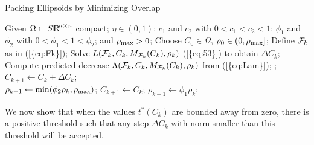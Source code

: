 \documentclass{siamltex}
\begin{document}
\begin{algorithm} \label{alg:xxx}
\caption{Packing Ellipsoids by Minimizing Overlap}
\begin{algorithmic}
  \STATE Given $\Omega \subset S {\makebox{\sf I \hspace{-8.5 pt} R \hspace{-4.0pt}}}^{n \times n}$ compact; $\eta \in
  (0,1)$; $c_1$ and $c_2$ with $0 < c_1 < c_2 < 1$; $\phi_1$ and
  $\phi_2$ with $0 < \phi_1 < 1 < \phi_2$; and
  ${\rho_{\mbox{\rm\scriptsize max}}} >0$;
\STATE Choose $C_0 \in \Omega$, $\rho_0 \in (0,{\rho_{\mbox{\rm\scriptsize max}}}]$;
\STATE Define ${{\cal F}}_k$  as in {(\ref{{eq:Fk}})}; 
\STATE Solve $L({{\cal F}}_k,C_k,M_{{{\cal F}}_k}(C_k),\rho_k)$ {(\ref{{eq:53}})} to obtain ${\Delta C}_k$; 
\STATE Compute predicted decrease  $\Lambda({{\cal F}}_k,C_k,M_{{{\cal F}}_k}(C_k),\rho_k)$ from
{(\ref{{eq:Lam}})};
;
\ENDIF
{}
\STATE $ C_{k+1} \leftarrow C_k + {\Delta C}_k$; \\
\STATE $\rho_{k+1}  \leftarrow \min( \phi_2 \rho_k, {\rho_{\mbox{\rm\scriptsize max}}})$; 
\ENDIF
\ELSE
\STATE $C_{k+1} \leftarrow C_k$;
\STATE $\rho_{k+1} \leftarrow \phi_1 \rho_k$; 
\ENDIF
\ENDFOR
\end{algorithmic}
\end{algorithm}

We now show that when the values $t^*(C_k)$ are bounded away from
zero, there is a positive threshold such that any step ${\Delta C}_k$ with
norm smaller than this threshold will be accepted.
\end{document}
